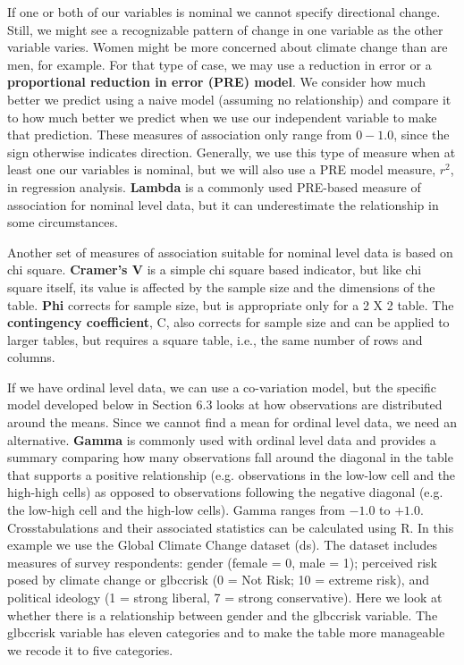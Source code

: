 \documentclass[11pt,openany]{book}\usepackage[]{graphicx}\usepackage[]{color}
\begin{document}
If one or both of our variables is nominal we cannot specify directional change.  Still, we might see a recognizable pattern of change in one variable as the other variable varies.  Women might be more concerned about climate change than are men, for example. For that type of case, we may use a reduction in error or a \textbf{proportional reduction in error (PRE) model}.  We consider how much better we predict using a naive model (assuming no relationship) and compare it to how much better we predict when we use our independent variable to make that prediction.   These measures of association only range from $0 - 1.0$, since the sign otherwise indicates direction.  Generally, we use this type of measure when at least one our variables is nominal, but we will also use a PRE model measure, $r^2$, in regression analysis.  \textbf{Lambda} is a commonly used PRE-based measure of association for nominal level data, but it can underestimate the relationship in some circumstances. 

Another set of measures of association suitable for nominal level data is based on chi square.  \textbf{Cramer's V} is a simple chi square based indicator, but like chi square itself, its value is affected by the sample size and the dimensions of the table.  \textbf{Phi} corrects for sample size, but is appropriate only for a 2 X 2 table.  The \textbf{contingency coefficient}, C, also corrects for sample size and can be applied to larger tables, but requires a square table, i.e., the same number of rows and columns. 

If we have ordinal level data, we can use a co-variation model, but the specific model developed below in Section 6.3 looks at how observations are distributed around the means.  Since we cannot find a mean for ordinal level data, we need an alternative.  \textbf{Gamma} is commonly used with ordinal level data and provides a summary comparing how many observations fall around the diagonal in the table that supports a positive relationship (e.g. observations in the low-low cell and the high-high cells) as opposed to observations following the negative diagonal (e.g. the low-high cell and the high-low cells).  Gamma ranges from $-1.0$  to $+1.0$.\\

Crosstabulations and their associated statistics can be calculated using R.  In this example we use the Global Climate Change dataset (ds).  The dataset includes measures of survey respondents: gender (female = 0, male = 1); perceived risk posed by climate change or glbccrisk (0 = Not Risk; 10 = extreme risk), and political ideology (1 = strong liberal, 7 = strong conservative). Here we look at whether there is a relationship between gender and the glbccrisk variable.  The glbccrisk variable has eleven categories and to make the table more manageable we recode it to five categories.  
\end{document}
